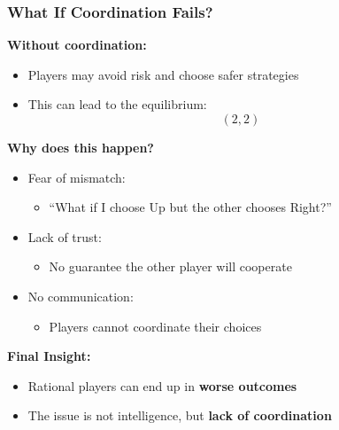 \begin{frame}[fragile]\frametitle{What If Coordination Fails?}

\textbf{Without coordination:}

\begin{itemize}
  \item Players may avoid risk and choose safer strategies
  \item This can lead to the equilibrium:
  \[
  (2,2)
  \]
\end{itemize}

\vspace{8pt}

\textbf{Why does this happen?}

\begin{itemize}
  \item Fear of mismatch:
  \begin{itemize}
    \item “What if I choose Up but the other chooses Right?”
  \end{itemize}
  
  \item Lack of trust:
  \begin{itemize}
    \item No guarantee the other player will cooperate
  \end{itemize}
  
  \item No communication:
  \begin{itemize}
    \item Players cannot coordinate their choices
  \end{itemize}
\end{itemize}

\vspace{8pt}

\textbf{Final Insight:}
\begin{itemize}
  \item Rational players can end up in \textbf{worse outcomes}
  \item The issue is not intelligence, but \textbf{lack of coordination}
\end{itemize}

\end{frame}

